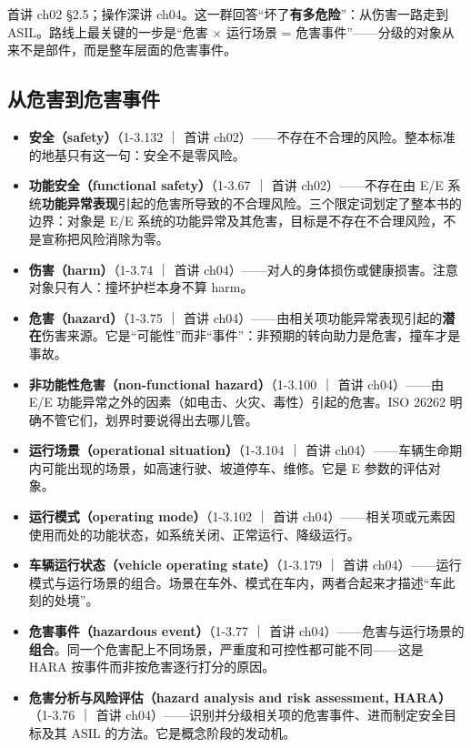 \begin{noteblock}
首讲 ch02 §2.5；操作深讲 ch04。这一群回答“坏了\textbf{有多危险}”：从伤害一路走到 ASIL。路线上最关键的一步是“危害 \(\times\) 运行场景 = 危害事件”——分级的对象从来不是部件，而是整车层面的危害事件。
\end{noteblock}

\subsection{从危害到危害事件}

\begin{itemize}
\item \textbf{安全（safety）}（1-3.132 ｜ 首讲 ch02）——不存在不合理的风险。整本标准的地基只有这一句：安全不是零风险。
\item \textbf{功能安全（functional safety）}（1-3.67 ｜ 首讲 ch02）——不存在由 E/E 系统\textbf{功能异常表现}引起的危害所导致的不合理风险。三个限定词划定了整本书的边界：对象是 E/E 系统的功能异常及其危害，目标是不存在不合理风险，不是宣称把风险消除为零。
\item \textbf{伤害（harm）}（1-3.74 ｜ 首讲 ch04）——对人的身体损伤或健康损害。注意对象只有人：撞坏护栏本身不算 harm。
\item \textbf{危害（hazard）}（1-3.75 ｜ 首讲 ch04）——由相关项功能异常表现引起的\textbf{潜在}伤害来源。它是“可能性”而非“事件”：非预期的转向助力是危害，撞车才是事故。
\item \textbf{非功能性危害（non-functional hazard）}（1-3.100 ｜ 首讲 ch04）——由 E/E 功能异常之外的因素（如电击、火灾、毒性）引起的危害。ISO 26262 明确不管它们，划界时要说得出去哪儿管。
\item \textbf{运行场景（operational situation）}（1-3.104 ｜ 首讲 ch04）——车辆生命期内可能出现的场景，如高速行驶、坡道停车、维修。它是 E 参数的评估对象。
\item \textbf{运行模式（operating mode）}（1-3.102 ｜ 首讲 ch04）——相关项或元素因使用而处的功能状态，如系统关闭、正常运行、降级运行。
\item \textbf{车辆运行状态（vehicle operating state）}（1-3.179 ｜ 首讲 ch04）——运行模式与运行场景的组合。场景在车外、模式在车内，两者合起来才描述“车此刻的处境”。
\item \textbf{危害事件（hazardous event）}（1-3.77 ｜ 首讲 ch04）——危害与运行场景的\textbf{组合}。同一个危害配上不同场景，严重度和可控性都可能不同——这是 HARA 按事件而非按危害逐行打分的原因。
\item \textbf{危害分析与风险评估（hazard analysis and risk assessment, HARA）}（1-3.76 ｜ 首讲 ch04）——识别并分级相关项的危害事件、进而制定安全目标及其 ASIL 的方法。它是概念阶段的发动机。
\end{itemize}

